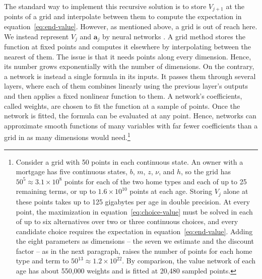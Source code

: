 The standard way to implement this recursive solution is to store $V_{j+1}$ at the points
of a grid and interpolate between them to compute the expectation in
equation~\eqref{eq:end-value}. However, as mentioned above, a grid is out of
reach here. We instead represent $V_j$ and $\mathbf a_j$ by neural networks
\citep{maliar2021deep,azinovic2022deep,druedahl2026deep,druedahl2026nonconvex}. A grid method stores the function at fixed points and computes it
elsewhere by interpolating between the nearest of them. The issue is that it needs points
along every dimension. Hence, its number grows exponentially with the number
of dimensions. On the contrary, a network is instead a single formula in its inputs. It
passes them through several layers, where each of them combines linearly using the previous layer's outputs and then applies a fixed nonlinear
function to them. A network's coefficients, called weights, are chosen to fit the
function at a sample of points. Once the network is fitted,
the formula can be evaluated at any point. Hence, networks can approximate smooth functions of many
variables with far fewer coefficients than a grid in as many dimensions
would need.\footnote{ Consider a grid with 50 points in each
continuous state. An owner with a mortgage has five continuous states, $b$,
$m$, $z$, $\nu$, and $h$, so the grid has $50^5\approx3.1\times10^8$ points
for each of the two home types and each of up to 25 remaining terms, or up
to $1.6\times10^{10}$ points at each age. Storing $V_j$ alone at these
points takes up to 125 gigabytes per age in double precision. At every
point, the maximization in equation~\eqref{eq:choice-value} must be solved
in each of up to six alternatives over two or three continuous choices, and
every candidate choice requires the expectation in
equation~\eqref{eq:end-value}. Adding the eight parameters as dimensions -- the seven we estimate and the discount factor --
as in the next paragraph, raises the number of points for each home type
and term to $50^{13}\approx1.2\times10^{22}$. By comparison, the value
network of each age has about 550,000 weights and is fitted at 20,480
sampled points.}



